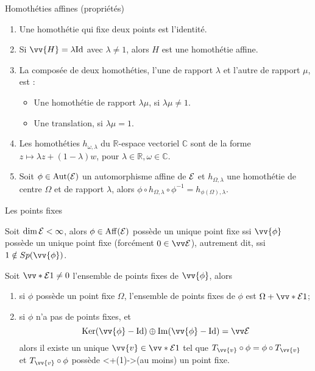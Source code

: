 \documentclass{m53beamer}
\begin{document}
  \begin{frame}{Homothéties affines (propriétés)}
    \begin{enumerate}[<+(1)->]
      \item Une homothétie qui fixe deux points est l'identité.
      \item Si $\vv{H}=\lambda\id$ avec $\lambda\neq1$, alors $H$ est une homothétie affine.
      \item La composée de deux homothéties, l'une de rapport $\lambda$ et l'autre de rapport $\mu$, est :
      \begin{itemize}[<+(1)->]
        \item Une homothétie de rapport $\lambda\mu$, si $\lambda\mu \neq 1$.
        \item Une translation, si $\lambda\mu=1$.
      \end{itemize}
      \item Les homothéties $h_{\omega,\lambda}$ du $\mathbb{R}$-espace vectoriel $\mathbb{C}$ sont de la forme $z \mapsto \lambda z + (1-\lambda)w$, pour $\lambda \in \mathbb{R}, \omega \in \mathbb{C}$.
      \item Soit $\phi \in \operatorname{Aut}(\mathcal{E})$ un automorphisme affine de $\mathcal{E}$ et $h_{\Omega,\lambda}$ une homothétie de centre $\Omega$ et de rapport $\lambda$, alors $\phi\circ h_{\Omega,\lambda}\circ\phi^{-1}=h_{\phi(\Omega),\lambda}$.
    \end{enumerate}
  \end{frame}
  \begin{frame}{Les points fixes}
    \begin{proposition}
      Soit $\dim \mathcal{E} < \infty$, alors $\phi\in\operatorname{Aff}(\mathcal{E})$ possède un unique point fixe ssi $\vv{\phi}$ possède un unique point fixe (forcément $0\in\ev{E}$)\pause, autrement dit, ssi $1 \notin Sp(\vv{\phi})$.
    \end{proposition}\pause
    \begin{proposition}
      Soit $\vv*{\ens{E}}{1} \neq 0$ l'ensemble de points fixes de $\vv{\phi}$, alors
      \begin{enumerate}[<+(1)->]
        \item si $\phi$ possède un point fixe $\Omega$, l'ensemble de points fixes de $\phi$ est $\Omega+\vv*{\ens{E}}{1}$;
        \item si $\phi$ n'a pas de points fixes\pause, et
          $$
            \ker(\vv{\phi}-\id) \oplus \im(\vv{\phi}-\id) = \ev{E}
          $$\pause
        alors il existe un unique $\vv{v}\in\vv*{\ens{E}}{1}$ tel que $T_{\vv{v}}\circ\phi=\phi\circ T_{\vv{v}}$\pause\\
        et $T_{\vv{v}}\circ\phi$ possède \uncover<+(1)->{(au moins)} un point fixe.
      \end{enumerate}
    \end{proposition}
  \end{frame}
\end{document}
